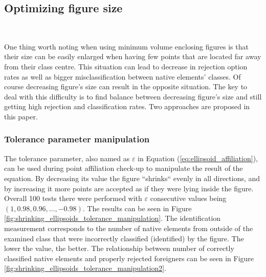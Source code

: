 \subsection{Optimizing figure size} \ \label{size_optimizing}

One thing worth noting when using minimum volume enclosing figures is that their size can be easily enlarged when having few points that are located far away from their class centre. This situation can lead to decrease in rejection option rates as well as bigger misclassification between native elements' classes. Of course decreasing figure's size can result in the opposite situation. The key to deal with this difficulty is to find balance between decreasing figure's size and still getting high rejection and classification rates. Two approaches are proposed in this paper.

\subsubsection{Tolerance parameter manipulation}

The tolerance parameter, also named as $\varepsilon$ in Equation (\ref{eq:ellipsoid_affiliation}), can be used during point affiliation check-up to manipulate the result of the equation. By decreasing its value the figure ``shrinks`` evenly in all directions, and by increasing it more points are accepted as if they were lying inside the figure. Overall 100 tests there were performed with $\varepsilon$ consecutive values being~$(1, 0.98, 0.96, \dots, -0.98)$. The results can be seen in Figure \ref{fig:shrinking_ellipsoids_tolerance_manipulation}. The identification measurement corresponds to the number of native elements from outside of the examined class that were incorrectly classified (identified) by the figure. The lower the value, the better. The relationship between number of correctly classified native elements and properly rejected foreigners can be seen in Figure \ref{fig:shrinking_ellipsoids_tolerance_manipulation2}.


